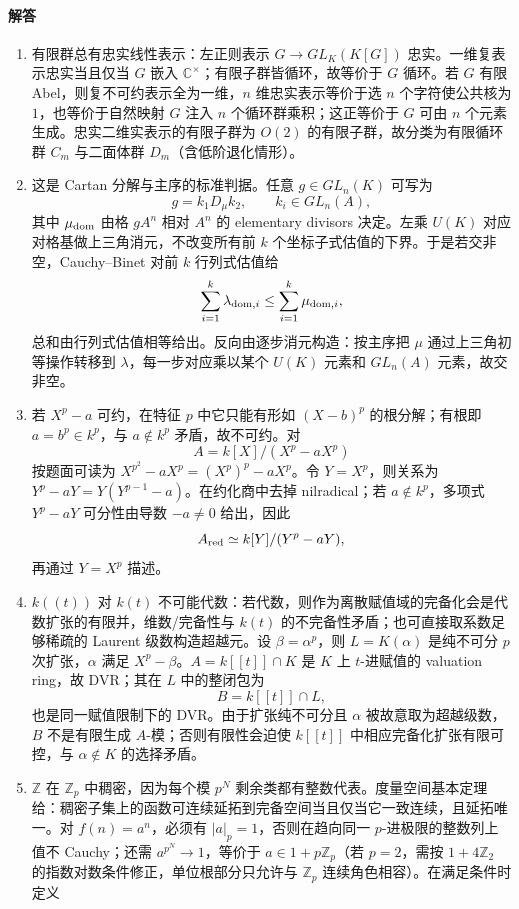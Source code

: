 \documentclass[UTF8,12pt]{ctexart}
\begin{document}
\paragraph{解答}
\begin{enumerate}[label=\textbf{\arabic*.},leftmargin=2.2em]
\item 有限群总有忠实线性表示：左正则表示 \(G\to GL_K(K[G])\) 忠实。一维复表示忠实当且仅当 \(G\) 嵌入 \(\mathbb C^\times\)；有限子群皆循环，故等价于 \(G\) 循环。若 \(G\) 有限 Abel，则复不可约表示全为一维，\(n\) 维忠实表示等价于选 \(n\) 个字符使公共核为 \(1\)，也等价于自然映射 \(G\) 注入 \(n\) 个循环群乘积；这正等价于 \(G\) 可由 \(n\) 个元素生成。忠实二维实表示的有限子群为 \(O(2)\) 的有限子群，故分类为有限循环群 \(C_m\) 与二面体群 \(D_m\)（含低阶退化情形）。
\item 这是 Cartan 分解与主序的标准判据。任意 \(g\in GL_n(K)\) 可写为
\[
g=k_1D_\mu k_2,\qquad k_i\in GL_n(A),
\]
其中 \(\mu_{\rm dom}\) 由格 \(gA^n\) 相对 \(A^n\) 的 elementary divisors 决定。左乘 \(U(K)\) 对应对格基做上三角消元，不改变所有前 \(k\) 个坐标子式估值的下界。于是若交非空，Cauchy--Binet 对前 \(k\) 行列式估值给
\[
\sum_{i=1}^k \lambda_{{\rm dom},i}\le\sum_{i=1}^k\mu_{{\rm dom},i},
\]
总和由行列式估值相等给出。反向由逐步消元构造：按主序把 \(\mu\) 通过上三角初等操作转移到 \(\lambda\)，每一步对应乘以某个 \(U(K)\) 元素和 \(GL_n(A)\) 元素，故交非空。
\item 若 \(X^p-a\) 可约，在特征 \(p\) 中它只能有形如 \((X-b)^p\) 的根分解；有根即 \(a=b^p\in k^p\)，与 \(a\notin k^p\) 矛盾，故不可约。对
\[
A=k[X]/(X^p-aX^p)
\]
按题面可读为 \(X^{p^2}-aX^p=(X^p)^p-aX^p\)。令 \(Y=X^p\)，则关系为 \(Y^p-aY=Y(Y^{p-1}-a)\)。在约化商中去掉 nilradical；若 \(a\notin k^p\)，多项式 \(Y^p-aY\) 可分性由导数 \(-a\ne0\) 给出，因此
\[
A_{\rm red}\simeq k[Y]/(Y^p-aY),
\]
再通过 \(Y=X^p\) 描述。
\item \(k((t))\) 对 \(k(t)\) 不可能代数：若代数，则作为离散赋值域的完备化会是代数扩张的有限并，维数/完备性与 \(k(t)\) 的不完备性矛盾；也可直接取系数足够稀疏的 Laurent 级数构造超越元。设 \(\beta=\alpha^p\)，则 \(L=K(\alpha)\) 是纯不可分 \(p\) 次扩张，\(\alpha\) 满足 \(X^p-\beta\)。\(A=k[[t]]\cap K\) 是 \(K\) 上 \(t\)-进赋值的 valuation ring，故 DVR；其在 \(L\) 中的整闭包为
\[
B=k[[t]]\cap L,
\]
也是同一赋值限制下的 DVR。由于扩张纯不可分且 \(\alpha\) 被故意取为超越级数，\(B\) 不是有限生成 \(A\)-模；否则有限性会迫使 \(k[[t]]\) 中相应完备化扩张有限可控，与 \(\alpha\notin K\) 的选择矛盾。
\item \(\mathbb Z\) 在 \(\mathbb Z_p\) 中稠密，因为每个模 \(p^N\) 剩余类都有整数代表。度量空间基本定理给：稠密子集上的函数可连续延拓到完备空间当且仅当它一致连续，且延拓唯一。对 \(f(n)=a^n\)，必须有 \(|a|_p=1\)，否则在趋向同一 \(p\)-进极限的整数列上值不 Cauchy；还需 \(a^{p^N}\to1\)，等价于 \(a\in1+p\mathbb Z_p\)（若 \(p=2\)，需按 \(1+4\mathbb Z_2\) 的指数对数条件修正，单位根部分只允许与 \(\mathbb Z_p\) 连续角色相容）。在满足条件时定义

\end{enumerate}
\end{document}
